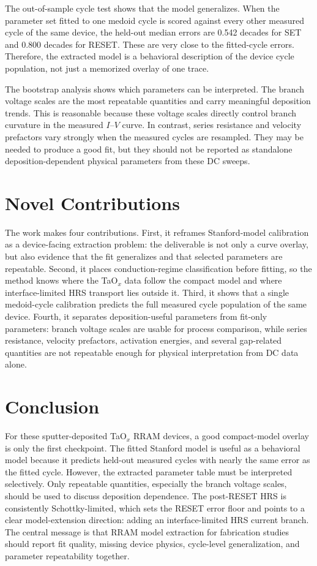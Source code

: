 \documentclass[10pt,letterpaper]{article}
\begin{document}
The out-of-sample cycle test shows that the model generalizes.  When the
parameter set fitted to one medoid cycle is scored against every other
measured cycle of the same device, the held-out median errors are 0.542
decades for SET and 0.800 decades for RESET.  These are very close to the
fitted-cycle errors.  Therefore, the extracted model is a behavioral
description of the device cycle population, not just a memorized overlay of
one trace.

The bootstrap analysis shows which parameters can be interpreted.  The branch
voltage scales are the most repeatable quantities and carry meaningful
deposition trends.  This is reasonable because these voltage scales directly
control branch curvature in the measured $I$--$V$ curve.  In contrast, series
resistance and velocity prefactors vary strongly when the measured cycles are
resampled.  They may be needed to produce a good fit, but they should not be
reported as standalone deposition-dependent physical parameters from these DC
sweeps.

\section*{Novel Contributions}
The work makes four contributions.  First, it reframes Stanford-model
calibration as a device-facing extraction problem: the deliverable is not only
a curve overlay, but also evidence that the fit generalizes and that selected
parameters are repeatable.  Second, it places conduction-regime classification
before fitting, so the method knows where the TaO$_x$ data follow the compact
model and where interface-limited HRS transport lies outside it.  Third, it
shows that a single medoid-cycle calibration predicts the full measured cycle
population of the same device.  Fourth, it separates deposition-useful
parameters from fit-only parameters: branch voltage scales are usable for
process comparison, while series resistance, velocity prefactors, activation
energies, and several gap-related quantities are not repeatable enough for
physical interpretation from DC data alone.

\section*{Conclusion}
For these sputter-deposited TaO$_x$ RRAM devices, a good compact-model overlay
is only the first checkpoint.  The fitted Stanford model is useful as a
behavioral model because it predicts held-out measured cycles with nearly the
same error as the fitted cycle.  However, the extracted parameter table must
be interpreted selectively.  Only repeatable quantities, especially the branch
voltage scales, should be used to discuss deposition dependence.  The
post-RESET HRS is consistently Schottky-limited, which sets the RESET error
floor and points to a clear model-extension direction: adding an
interface-limited HRS current branch.  The central message is that RRAM model
extraction for fabrication studies should report fit quality, missing device
physics, cycle-level generalization, and parameter repeatability together.
\end{document}
